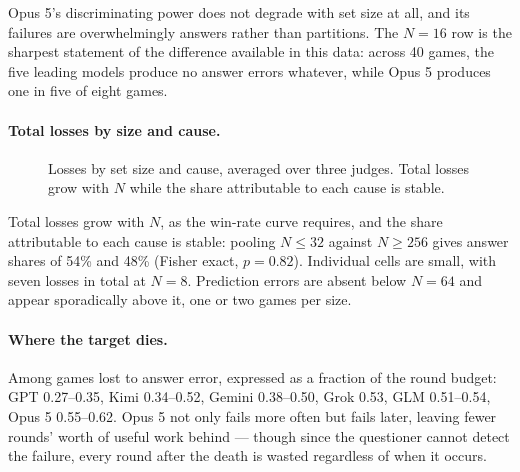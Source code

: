 \documentclass[11pt]{article}
\begin{document}
Opus 5's discriminating power does not degrade with set size at all, and its
failures are overwhelmingly answers rather than partitions. The $N{=}16$ row is the sharpest
statement of the difference available in this data: across 40 games, the five
leading models produce no answer errors whatever, while Opus 5 produces one in
five of eight games.

\paragraph{Total losses by size and cause.}

\begin{figure}[tbp]
\centering
{}
\caption{Losses by set size and cause, averaged over three judges. Total losses grow with $N$ while the share attributable to each cause is stable.}
\label{fig:losses}
\end{figure}

Total losses grow with $N$, as the win-rate curve requires, and the share
attributable to each cause is stable: pooling $N\le32$ against $N\ge256$ gives
answer shares of 54\% and 48\% (Fisher exact, $p=0.82$). Individual cells are
small, with seven losses in total at $N{=}8$. Prediction errors are absent
below $N{=}64$ and appear sporadically above it, one or two games per size.

\paragraph{Where the target dies.} Among games lost to answer error, expressed
as a fraction of the round budget: GPT 0.27--0.35, Kimi 0.34--0.52, Gemini
0.38--0.50, Grok 0.53, GLM 0.51--0.54, Opus 5 0.55--0.62. Opus 5 not only fails
more often but fails later, leaving fewer rounds' worth of useful work behind
--- though since the questioner cannot detect the failure, every round after the
death is wasted regardless of when it occurs.
\end{document}
